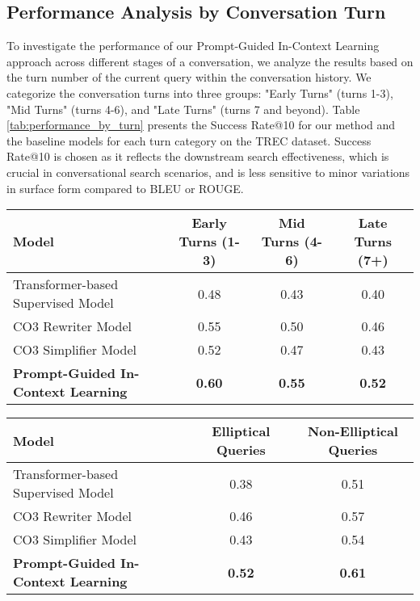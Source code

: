 \subsection{Performance Analysis by Conversation Turn}

To investigate the performance of our Prompt-Guided In-Context Learning approach across different stages of a conversation, we analyze the results based on the turn number of the current query within the conversation history. We categorize the conversation turns into three groups: "Early Turns" (turns 1-3), "Mid Turns" (turns 4-6), and "Late Turns" (turns 7 and beyond).  Table \ref{tab:performance_by_turn} presents the Success Rate@10 for our method and the baseline models for each turn category on the TREC dataset.  Success Rate@10 is chosen as it reflects the downstream search effectiveness, which is crucial in conversational search scenarios, and is less sensitive to minor variations in surface form compared to BLEU or ROUGE.

\begin{table*}[!t]
    \centering
    \caption{Performance (Success Rate@10) by Conversation Turn on TREC Dataset}
    \label{tab:performance_by_turn}
    \begin{tabular}{lccc}
        \toprule
        Model & Early Turns (1-3) & Mid Turns (4-6) & Late Turns (7+) \\
        \midrule
        Transformer-based Supervised Model & 0.48 & 0.43 & 0.40 \\
        CO3 Rewriter Model & 0.55 & 0.50 & 0.46 \\
        CO3 Simplifier Model & 0.52 & 0.47 & 0.43 \\
        \midrule
        \textbf{Prompt-Guided In-Context Learning} & \textbf{0.60} & \textbf{0.55} & \textbf{0.52} \\
        \bottomrule
    \end{tabular}
\end{table*}

\begin{table*}[!t]
    \centering
    \caption{Performance (Success Rate@10) by Query Type (Elliptical vs. Non-Elliptical) on TREC Dataset}
    \label{tab:performance_by_query_type}
    \begin{tabular}{lcc}
        \toprule
        Model & Elliptical Queries & Non-Elliptical Queries \\
        \midrule
        Transformer-based Supervised Model & 0.38 & 0.51 \\
        CO3 Rewriter Model & 0.46 & 0.57 \\
        CO3 Simplifier Model & 0.43 & 0.54 \\
        \midrule
        \textbf{Prompt-Guided In-Context Learning} & \textbf{0.52} & \textbf{0.61} \\
        \bottomrule
    \end{tabular}
\end{table*}

